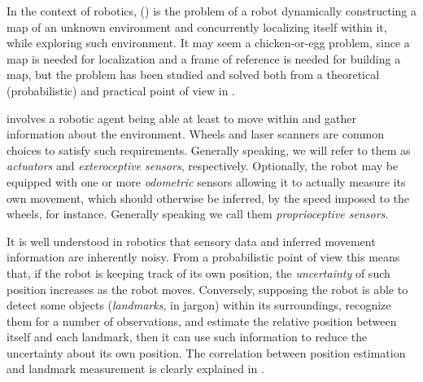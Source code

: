 In the context of robotics, \Slam{} (\SLAM) is the problem of a robot dynamically constructing a map of an unknown environment and concurrently localizing itself within it, while exploring such environment. 
It may seem a chicken-or-egg problem, since a map is needed for localization and a frame of reference is needed for building a map, but the problem has been studied and solved both from a theoretical (probabilistic) and practical point of view in \cite{thrun2005}.

\SLAM{} involves a robotic agent being able at least to move within and gather information about the environment. Wheels and laser scanners are common choices to satisfy such requirements. 
Generally speaking, we will refer to them as \emph{actuators} and \emph{exteroceptive sensors}, respectively. 
Optionally, the robot may be equipped with one or more \emph{odometric} sensors allowing it to actually measure its own movement, which should otherwise be inferred, by the speed imposed to the wheels, for instance. 
Generally speaking we call them \emph{proprioceptive sensors}. 

It is well understood in robotics that sensory data and inferred movement information are inherently noisy. 
From a probabilistic point of view this means that, if the robot is keeping track of its own position, the \emph{uncertainty} of such position increases as the robot moves. 
Conversely, supposing the robot is able to detect some objects (\emph{landmarks}, in jargon) within its surroundings, recognize them for a number of observations, and estimate the relative position between itself and each landmark, then it can use such information to reduce the uncertainty about its own position.
The correlation between position estimation and landmark measurement is clearly explained in \cite[Unit C]{brenner204}.

